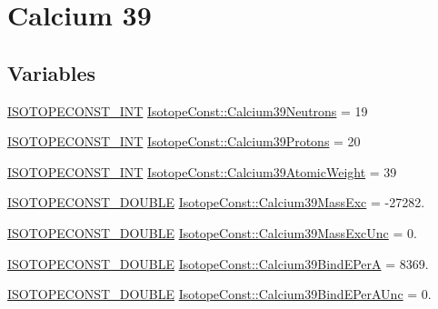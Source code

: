 \hypertarget{group___isotope_const-_calcium-_ca39}{}\section{Calcium 39}
\label{group___isotope_const-_calcium-_ca39}
\subsection*{Variables}
\begin{DoxyCompactItemize}
\item 
\mbox{\hyperlink{group___isotope_const-_macros_ga5f18360b3e99483a35c32d789e62621c}{I\+S\+O\+T\+O\+P\+E\+C\+O\+N\+S\+T\+\_\+\+I\+NT}} \mbox{\hyperlink{group___isotope_const-_calcium-_ca39_ga960d2484184545f7ba0a67df02e04c82}{Isotope\+Const\+::\+Calcium39\+Neutrons}} = 19
\item 
\mbox{\hyperlink{group___isotope_const-_macros_ga5f18360b3e99483a35c32d789e62621c}{I\+S\+O\+T\+O\+P\+E\+C\+O\+N\+S\+T\+\_\+\+I\+NT}} \mbox{\hyperlink{group___isotope_const-_calcium-_ca39_ga93c5ced625130b626bb22a6d84181834}{Isotope\+Const\+::\+Calcium39\+Protons}} = 20
\item 
\mbox{\hyperlink{group___isotope_const-_macros_ga5f18360b3e99483a35c32d789e62621c}{I\+S\+O\+T\+O\+P\+E\+C\+O\+N\+S\+T\+\_\+\+I\+NT}} \mbox{\hyperlink{group___isotope_const-_calcium-_ca39_ga935e5bd1d1d3d650021b36c6d41282bb}{Isotope\+Const\+::\+Calcium39\+Atomic\+Weight}} = 39
\item 
\mbox{\hyperlink{group___isotope_const-_macros_ga8f45a7272ce02c0b4c65c44636ed719a}{I\+S\+O\+T\+O\+P\+E\+C\+O\+N\+S\+T\+\_\+\+D\+O\+U\+B\+LE}} \mbox{\hyperlink{group___isotope_const-_calcium-_ca39_ga3ce6960bc2fcfd7fc9a0a430f04a105c}{Isotope\+Const\+::\+Calcium39\+Mass\+Exc}} = -\/27282.
\item 
\mbox{\hyperlink{group___isotope_const-_macros_ga8f45a7272ce02c0b4c65c44636ed719a}{I\+S\+O\+T\+O\+P\+E\+C\+O\+N\+S\+T\+\_\+\+D\+O\+U\+B\+LE}} \mbox{\hyperlink{group___isotope_const-_calcium-_ca39_ga84151a257be08ee8691e3abf1946f565}{Isotope\+Const\+::\+Calcium39\+Mass\+Exc\+Unc}} = 0.
\item 
\mbox{\hyperlink{group___isotope_const-_macros_ga8f45a7272ce02c0b4c65c44636ed719a}{I\+S\+O\+T\+O\+P\+E\+C\+O\+N\+S\+T\+\_\+\+D\+O\+U\+B\+LE}} \mbox{\hyperlink{group___isotope_const-_calcium-_ca39_ga3b10292e404fcd279bb0866918ee5a3c}{Isotope\+Const\+::\+Calcium39\+Bind\+E\+PerA}} = 8369.
\item 
\mbox{\hyperlink{group___isotope_const-_macros_ga8f45a7272ce02c0b4c65c44636ed719a}{I\+S\+O\+T\+O\+P\+E\+C\+O\+N\+S\+T\+\_\+\+D\+O\+U\+B\+LE}} \mbox{\hyperlink{group___isotope_const-_calcium-_ca39_ga573394887b07ca90fa74f5f381b5742b}{Isotope\+Const\+::\+Calcium39\+Bind\+E\+Per\+A\+Unc}} = 0.

\end{DoxyCompactItemize}
